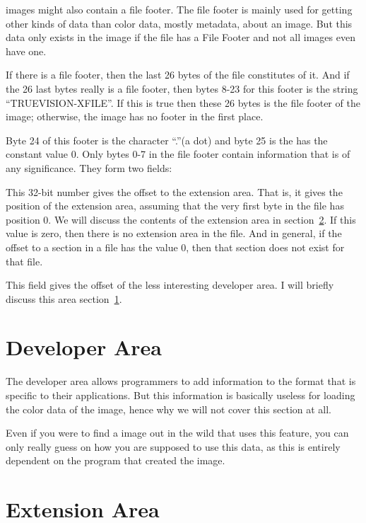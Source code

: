\tga images might also contain a file footer. The file footer is mainly
used for getting other kinds of data than color data, mostly metadata,
about an image. But this data only exists in the image if the file has
a File Footer and not all \tga images even have one.

If there is a file footer, then the last 26 bytes of the file
constitutes of it. And if the 26 last bytes really is a file footer,
then bytes 8-23 for this footer is the \ascii string
``TRUEVISION-XFILE''. If this is true then these 26 bytes is the file
footer of the image; otherwise, the image has no footer in the first
place.

Byte 24 of this footer is the \ascii character ``.''(a dot) and byte
25 is the has the constant value $0$. Only bytes 0-7 in the file
footer contain information that is of any significance. They form two
fields:


This 32-bit number gives the offset to the extension area. That is, it
gives the position of the extension area, assuming that the very first
byte in the file has position 0. We will discuss the contents of the
extension area in section~\ref{sec:tga-extension-area}. If this value
is zero, then there is no extension area in the file. And in general,
if the offset to a section in a file has the value $0$, then that
section does not exist for that file.


This field gives the offset of the less interesting developer area. I
will briefly discuss this area section~\ref{sec:developer-area}.

\section{Developer Area}
\label{sec:developer-area}

The developer area allows programmers to add information to the \tga
format that is specific to their applications. But this information is
basically useless for loading the color data of the \tga image, hence
why we will not cover this section at all.

Even if you were to find a \tga image out in the wild that uses this
feature, you can only really guess on how you are supposed to use this
data, as this is entirely dependent on the program that created the
image.

\section{Extension Area}
\label{sec:tga-extension-area}

